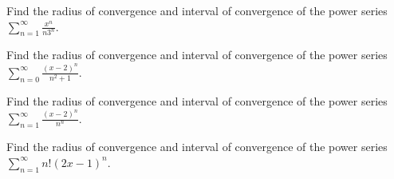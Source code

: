 \documentclass[
  course = {{MATH102 Calculus II}},
  quartile = {{2}},
  assignment = 24,%
  topic = {{11.8: Power Series}},
  firstexercise = 1,
  term = 202
]{aga-homework}
\begin{document}
\newpage

\problem Find the radius of convergence and interval of convergence of the power series $\displaystyle \sum_{n=1}^{\infty}\frac{x^{n}}{n3^n}$.

\newpage

\problem Find the radius of convergence and interval of convergence of the power series $\displaystyle \sum_{n=0}^{\infty}\frac{(x-2)^{n}}{n^2+1}$.

\newpage

\problem Find the radius of convergence and interval of convergence of the power series $\displaystyle \sum_{n=1}^{\infty}\frac{(x-2)^{n}}{n^n}$.

\newpage

\problem Find the radius of convergence and interval of convergence of the power series $\displaystyle \sum_{n=1}^{\infty}n!(2x-1)^n $.


\newpage
\afterpage{\null\newpage}

\afterpage{\null\newpage}

\afterpage{\null\newpage}
\end{document}
